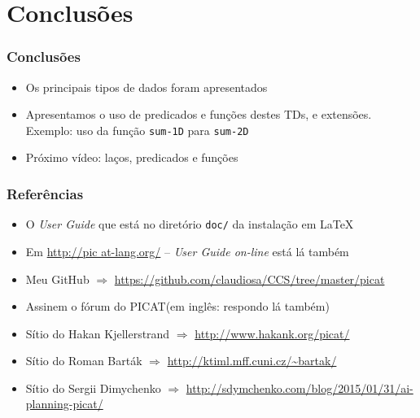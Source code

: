 \section{Conclusões}
\begin{frame}
    \frametitle{Conclusões}
    \begin{itemize}
    \item Os principais tipos de dados foram apresentados
      \pause 
    \item Apresentamos o uso de predicados e funções destes TDs, 
    e extensões. Exemplo: uso da função \texttt{sum-1D} para \texttt{sum-2D}
      \pause 
    \item Próximo vídeo: laços, predicados e funções

    
    \end{itemize}
\end{frame}


\begin{frame}
    \frametitle{Referências}
    \begin{itemize}
    \item O \textit{User Guide} que está no diretório  \texttt{doc/} da instalação em \LaTeX 
    \item Em \url{http://pic at-lang.org/} -- \textit{User Guide on-line} está lá também
    
     \item Meu GitHub $\Rightarrow $ \url{https://github.com/claudiosa/CCS/tree/master/picat}
    
    \item Assinem o fórum do PICAT(em inglês: respondo lá também)

    \item Sítio do Hakan  Kjellerstrand  $\Rightarrow $ \url{http://www.hakank.org/picat/}
    \item Sítio do Roman Barták  $\Rightarrow $ \url{http://ktiml.mff.cuni.cz/~bartak/}
    \item Sítio do Sergii Dimychenko  $\Rightarrow $ \url{http://sdymchenko.com/blog/2015/01/31/ai-planning-picat/}
    
    \end{itemize}
\end{frame}

